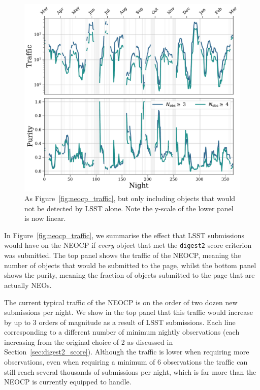 \documentclass[twocolumn]{aastex631}
\newcommand{\dig}{\texttt{digest2}}
\begin{document}
\begin{figure}
    \centering
    \includegraphics[width=\textwidth]{traffic_purity_unfindable.pdf}
    \caption{As Figure~\ref{fig:neocp_traffic}, but only including objects that would not be detected by LSST alone. Note the y-scale of the lower panel is now linear.}
    \label{fig:neocp_traffic_unfindable}
\end{figure}

In Figure~\ref{fig:neocp_traffic}, we summarise the effect that LSST submissions would have on the NEOCP if \textit{every} object that met the \dig{} score criterion was submitted. The top panel shows the traffic of the NEOCP, meaning the number of objects that would be submitted to the page, whilst the bottom panel shows the purity, meaning the fraction of objects submitted to the page that are actually NEOs.

The current typical traffic of the NEOCP is on the order of two dozen new submissions per night. We show in the top panel that this traffic would increase by up to 3 orders of magnitude as a result of LSST submissions. Each line corresponding to a different number of minimum nightly observations (each increasing from the original choice of 2 as discussed in Section~\ref{sec:digest2_score}). Although the traffic is lower when requiring more observations, even when requiring a minimum of 6 observations the traffic can still reach several thousands of submissions per night, which is far more than the NEOCP is currently equipped to handle.
\end{document}

